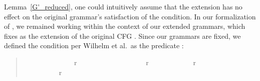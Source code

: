\begin{isabellebody}
\begin{isamarkuptext}
Lemma~\ref{G'_reduced}, one could intuitively assume that the extension has no effect on the original
grammar's satisfaction of the  condition. In our formalization of , we remained working
within the context of our extended grammars, which fixes  as the extension of the original CFG .
Since our grammars are fixed, we defined the  condition per Wilhelm et al.\ as the predicate 
:
\begin{quote}
%
\begin{isabelle}%
\ \ {\isasymequiv}\isanewline
{\isasymforall}\isabound{{\isasymalpha}}\ \ \isabound{{\isasymbeta}}\ \ \isabound{{\isasymgamma}}\ \ \ \isanewline
\isaindent{\ \ \ }\ {\isasymturnstile}\ {\isacharbrackleft}{\kern0pt}\ \ {\isasymRightarrow}r{\isacharasterisk}{\kern0pt}\ \isabound{{\isasymalpha}}\ {\isacharat}{\kern0pt}\ \ \ {\isacharhash}{\kern0pt}\ \ \ \ {\isasymand}\isanewline
\isaindent{\ \ \ }\ {\isasymturnstile}\ \isabound{{\isasymalpha}}\ {\isacharat}{\kern0pt}\ \ \ {\isacharhash}{\kern0pt}\ \ \ \ {\isasymRightarrow}r\ \isabound{{\isasymalpha}}\ {\isacharat}{\kern0pt}\ \isabound{{\isasymbeta}}\ {\isacharat}{\kern0pt}\ \ \ \ {\isasymand}\isanewline
\isaindent{\ \ \ }\ {\isasymturnstile}\ {\isacharbrackleft}{\kern0pt}\ \ {\isasymRightarrow}r{\isacharasterisk}{\kern0pt}\ \isabound{{\isasymgamma}}\ {\isacharat}{\kern0pt}\ \ \ {\isacharhash}{\kern0pt}\ \ \ \ {\isasymand}\isanewline
\isaindent{\ \ \ }\ {\isasymturnstile}\ \isabound{{\isasymgamma}}\ {\isacharat}{\kern0pt}\ \ \ {\isacharhash}{\kern0pt}\ \ \ \ {\isasymRightarrow}r\ \isabound{{\isasymalpha}}\ {\isacharat}{\kern0pt}\ \isabound{{\isasymbeta}}\ {\isacharat}{\kern0pt}\ \ \ \ {\isasymand}\ \isactrlbsub {}\isactrlesub \ {\isacharequal}{\kern0pt}\ \isactrlbsub {}\isactrlesub \ {\isasymlongrightarrow}\isanewline

\end{isabelle}
\end{quote}
\end{isamarkuptext}
\end{isabellebody}
